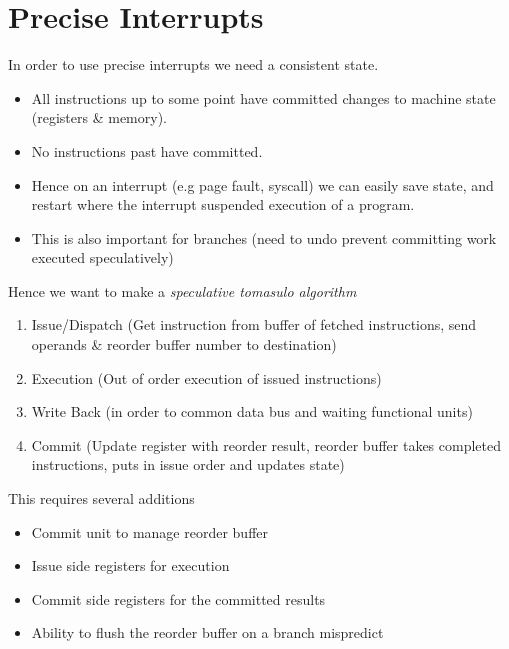 \section{Precise Interrupts}
In order to use precise interrupts we need a consistent state.
\begin{itemize}
	\item All instructions up to some point have committed changes to machine state (registers \& memory).
	\item No instructions past have committed.
	\item Hence on an interrupt (e.g page fault, syscall) we can easily save state, and restart where the interrupt suspended execution of a program.
	\item This is also important for branches (need to undo prevent committing work executed speculatively)
\end{itemize}
Hence we want to make a \textit{speculative tomasulo algorithm}
\begin{enumerate}
	\item Issue/Dispatch (Get instruction from buffer of fetched instructions, send operands \& reorder buffer number to destination)
	\item Execution (Out of order execution of issued instructions)
	\item Write Back (in order to common data bus and waiting functional units)
	\item Commit (Update register with reorder result, reorder buffer takes completed instructions, puts in issue order and updates state)
\end{enumerate}
This requires several additions
\begin{itemize}
	\item Commit unit to manage reorder buffer
	\item Issue side registers for execution
	\item Commit side registers for the committed results
	\item Ability to flush the reorder buffer on a branch mispredict
\end{itemize}


